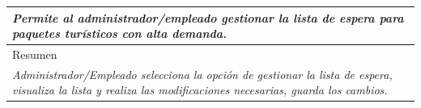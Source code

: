 \begin{table}[H]
\begin{tabular}{|llllllll|}
    \multicolumn{8}{|p{15cm}|}{{\color[HTML]{808080} \textit{Permite al administrador/empleado gestionar la lista de espera para paquetes tur\'isticos con alta demanda.}}}                                                                                                                                                                                       \\ \hline
    \multicolumn{8}{|l|}{Resumen}                                                                                                                                                                                                                                           \\ \hline
    \multicolumn{8}{|p{15cm}|}{{\color[HTML]{808080} \textit{Administrador/Empleado selecciona la opci\'on de gestionar la lista de espera, visualiza la lista y realiza las modificaciones necesarias, guarda los cambios.}}} \\ \hline
    \end{tabular}
\end{table}

